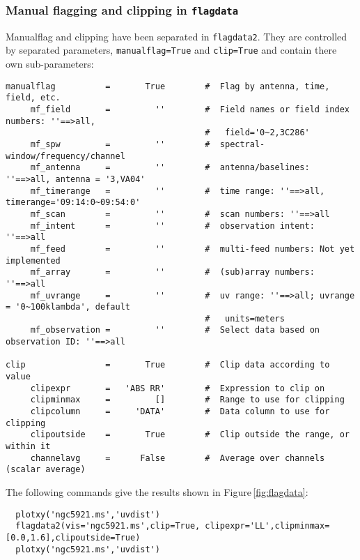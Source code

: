 \subsubsection{Manual flagging and clipping in {\tt flagdata}}
\label{section:edit.flagdata.clip}

Manualflag and clipping have been separated in {\tt flagdata2}. They are controlled by separated
parameters, {\tt manualflag=True} and {\tt clip=True} and contain there own sub-parameters:

\small
\begin{verbatim}
manualflag          =       True        #  Flag by antenna, time, field, etc.
     mf_field       =         ''        #  Field names or field index numbers: ''==>all,
                                        #   field='0~2,3C286'
     mf_spw         =         ''        #  spectral-window/frequency/channel
     mf_antenna     =         ''        #  antenna/baselines: ''==>all, antenna = '3,VA04'
     mf_timerange   =         ''        #  time range: ''==>all, timerange='09:14:0~09:54:0'
     mf_scan        =         ''        #  scan numbers: ''==>all
     mf_intent      =         ''        #  observation intent: ''==>all
     mf_feed        =         ''        #  multi-feed numbers: Not yet implemented
     mf_array       =         ''        #  (sub)array numbers: ''==>all
     mf_uvrange     =         ''        #  uv range: ''==>all; uvrange = '0~100klambda', default
                                        #   units=meters
     mf_observation =         ''        #  Select data based on observation ID: ''==>all

clip                =       True        #  Clip data according to value
     clipexpr       =   'ABS RR'        #  Expression to clip on
     clipminmax     =         []        #  Range to use for clipping
     clipcolumn     =     'DATA'        #  Data column to use for clipping
     clipoutside    =       True        #  Clip outside the range, or within it
     channelavg     =      False        #  Average over channels (scalar average)

\end{verbatim}
\normalsize

The following commands give the results shown in 
Figure\,\ref{fig:flagdata}:
\small
\begin{verbatim}
  plotxy('ngc5921.ms','uvdist')
  flagdata2(vis='ngc5921.ms',clip=True, clipexpr='LL',clipminmax=[0.0,1.6],clipoutside=True)
  plotxy('ngc5921.ms','uvdist')
\end{verbatim}
\normalsize

